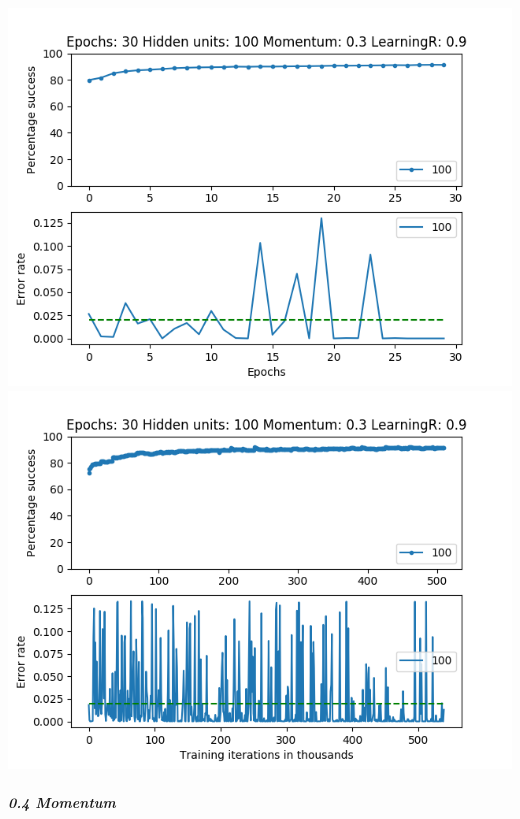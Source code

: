 \documentclass[11pt]{article}
\makeatletter
\def\maxwidth{\ifdim\Gin@nat@width>\linewidth\linewidth
    \else\Gin@nat@width\fi}
\let\Oldincludegraphics\includegraphics
\renewcommand{\includegraphics}[1]{\Oldincludegraphics[width=.8\maxwidth]{#1}}
\makeatother
\begin{document}
\includegraphics{Experiment2/E2_NN_Epoch_Momentum_0.3_30Epochs_100Hiddenunits.png}
\includegraphics{Experiment2/E2_NN_Training_Momentum_0.3_30Epochs_100Hiddenunits.png}

\hypertarget{momentum-4}{%
\subparagraph{0.4 Momentum}\label{momentum-4}}
\end{document}
